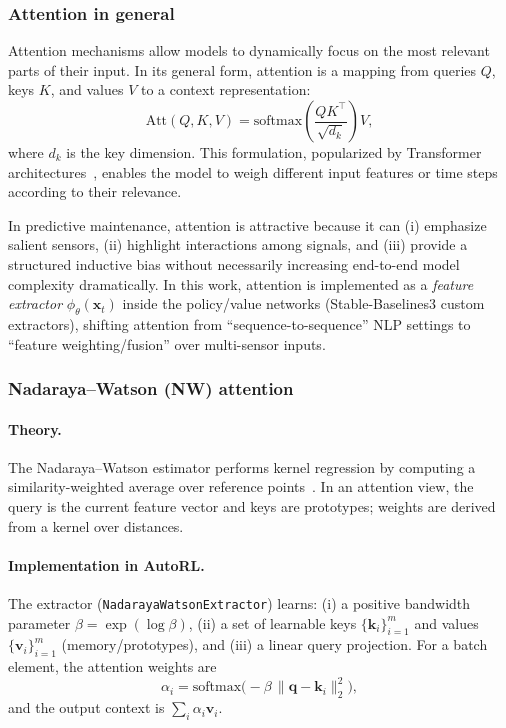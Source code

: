 \documentclass[11pt]{article}
\begin{document}
\subsubsection{Attention in general}
Attention mechanisms allow models to dynamically focus on the most relevant parts of their input. In its general form, attention is a mapping from queries $Q$, keys $K$, and values $V$ to a context representation:
\begin{equation}
  \mathrm{Att}(Q,K,V) = \mathrm{softmax}\!\left(\frac{QK^\top}{\sqrt{d_k}}\right)V,
\end{equation}
where $d_k$ is the key dimension. This formulation, popularized by Transformer architectures~\cite{Vaswani2017Attention}, enables the model to weigh different input features or time steps according to their relevance.

In predictive maintenance, attention is attractive because it can (i) emphasize salient sensors, (ii) highlight interactions among signals, and (iii) provide a structured inductive bias without necessarily increasing end-to-end model complexity dramatically. In this work, attention is implemented as a \emph{feature extractor} $\phi_\theta(\mathbf{x}_t)$ inside the policy/value networks (Stable-Baselines3 custom extractors), shifting attention from ``sequence-to-sequence'' NLP settings to ``feature weighting/fusion'' over multi-sensor inputs.

\subsubsection{Nadaraya--Watson (NW) attention}
\paragraph{Theory.}
The Nadaraya--Watson estimator performs kernel regression by computing a similarity-weighted average over reference points~\cite{Nadaraya1964, Watson1964}. In an attention view, the query is the current feature vector and keys are prototypes; weights are derived from a kernel over distances.

\paragraph{Implementation in AutoRL.}
The extractor (\texttt{NadarayaWatsonExtractor}) learns:
(i) a positive bandwidth parameter $\beta=\exp(\log\beta)$,
(ii) a set of learnable keys $\{\mathbf{k}_i\}_{i=1}^m$ and values $\{\mathbf{v}_i\}_{i=1}^m$ (memory/prototypes), and
(iii) a linear query projection.
For a batch element, the attention weights are
\begin{equation}
  \alpha_i = \mathrm{softmax}\bigl(-\beta\,\lVert \mathbf{q}-\mathbf{k}_i\rVert_2^2\bigr),
\end{equation}
and the output context is $\sum_i \alpha_i\mathbf{v}_i$.
\end{document}
